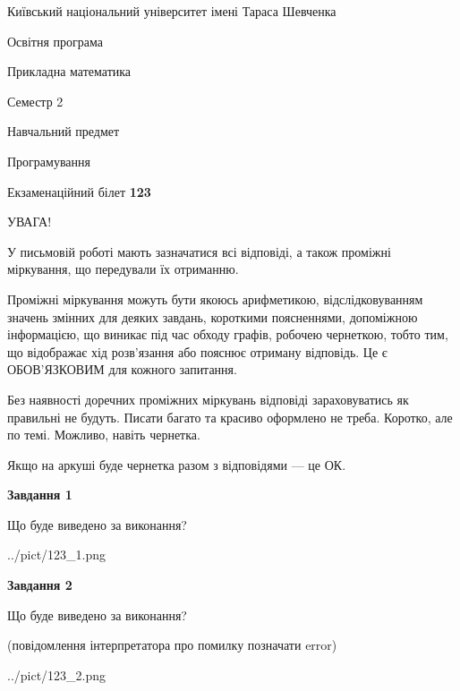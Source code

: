 \documentclass[12pt, ukrainian]{article}
\begin{document}
{{\begin {small}\par
{ \center  Київський національний університет імені Тараса Шевченка \par}
{\parbox {5 cm}{Освітня програма \hfill}{\parbox {7 cm}{Прикладна математика\hfill}}\parbox {6 cm}{\hfill Семестр 2}}\par
{\parbox {5 cm} {Навчальний предмет \hfill}\parbox {7 cm}{Програмування \hfill}\parbox {6cm}{\hfill}\par}\vspace{-7pt} \end{small}}{\center Екзаменаційний білет \No \textbf
{ 123 }\par}}
{
\begin {large}
УВАГА!

У письмовій роботі мають зазначатися всі відповіді, а також проміжні міркування, що передували їх отриманню.

Проміжні міркування можуть бути якоюсь арифметикою, відслідковуванням зна\-чень змінних для деяких завдань,
короткими поясненнями, допоміжною інформацією, що виникає під час обходу графів, робочею чернеткою,
тобто тим, що відображає хід розв’язання або пояснює отриману відповідь.
Це є ОБОВ’ЯЗКОВИМ для кожного запитання.

Без наявності доречних проміжних міркувань відповіді зараховуватись як правиль\-ні не будуть.
Писати багато та красиво оформлено не треба. Коротко, але по темі. Можли\-во, навіть чернетка.

Якщо на аркуші буде чернетка разом з відповідями --- це ОК.

\newpage

{\begin {center}\textbf{Завдання 1}\end {center}}\par
Що буде виведено за виконання?\par
\begin{center}
	{../pict/123_1.png}
\end{center}
\newpage

{\begin {center}\textbf{Завдання 2}\end {center}}\par
Що буде виведено за виконання?\par
 (повідомлення інтерпретатора про помилку позначати error)\par
\begin{center}
	{../pict/123_2.png}
\end{center}
\newpage


\end{large}}
\end{document}
